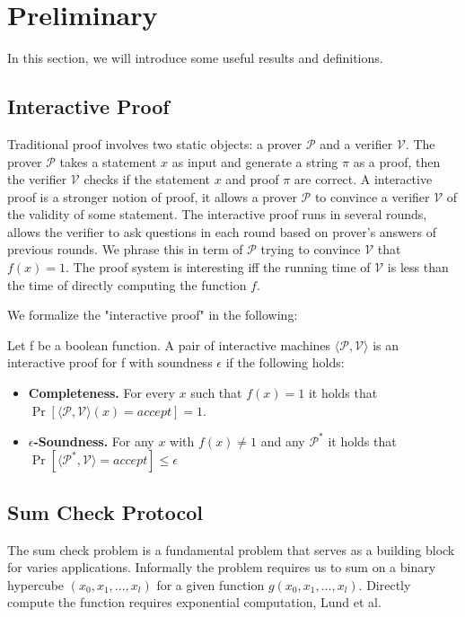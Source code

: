 \section{Preliminary}
In this section, we will introduce some useful results and definitions.
\subsection{Interactive Proof}
Traditional proof involves two static objects: a prover $\mathcal{P}$ and a verifier $\mathcal{V}$. The prover $\mathcal{P}$ takes a statement $x$ as input and generate a string $\pi$ as a proof, then the verifier $\mathcal{V}$ checks if the statement $x$ and proof $\pi$ are correct. A interactive proof is a stronger notion of proof, it allows a prover $\mathcal{P}$ to convince a verifier $\mathcal{V}$ of the validity of some statement. The interactive proof runs in several rounds, allows the verifier to ask questions in each round based on prover's answers of previous rounds. We phrase this in term of $\mathcal{P}$ trying to convince $\mathcal{V}$ that $f(x)=1$. The proof system is interesting iff the running time of $\mathcal{V}$ is less than the time of directly computing the function $f$.

We formalize the "interactive proof" in the following:

\begin{definition}
Let f be a boolean function. A pair of interactive machines $\langle\mathcal{P}, \mathcal{V}\rangle$ is an interactive proof for f with soundness $\epsilon$ if the following holds:
\begin{itemize}
	\item {\bf Completeness.} For every $x$ such that $f(x) = 1$ it holds that $\Pr[\langle\mathcal{P}, \mathcal{V}\rangle(x)=accept]=1$.
	\item {\bf $\epsilon$-Soundness.} For any $x$ with $f(x) \neq 1$ and any $\mathcal{P}^*$ it holds that $\Pr[\langle\mathcal{P^*},\mathcal{V}\rangle=accept] \le \epsilon$
\end{itemize}

\subsection{Sum Check Protocol}
The sum check problem is a fundamental problem that serves as a building block for varies applications. Informally the problem requires us to sum on a binary hypercube $(x_0, x_1, ..., x_l)$ for a given function $g(x_0, x_1, ..., x_l)$. Directly compute the function requires exponential computation, Lund et al.\cite{sumcheck}
\end{definition}